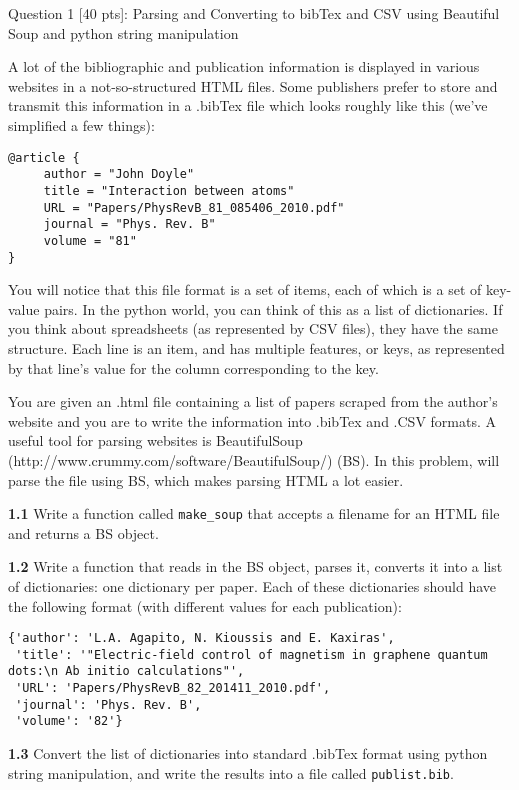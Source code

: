 \documentclass[11pt]{article}
\begin{document}
     Question 1 {[}40 pts{]}: Parsing and Converting to bibTex and CSV using
Beautiful Soup and python string manipulation

A lot of the bibliographic and publication information is displayed in
various websites in a not-so-structured HTML files. Some publishers
prefer to store and transmit this information in a .bibTex file which
looks roughly like this (we've simplified a few things):

\begin{verbatim}
@article { 
     author = "John Doyle"
     title = "Interaction between atoms"
     URL = "Papers/PhysRevB_81_085406_2010.pdf"
     journal = "Phys. Rev. B"
     volume = "81"
}
\end{verbatim}

You will notice that this file format is a set of items, each of which
is a set of key-value pairs. In the python world, you can think of this
as a list of dictionaries. If you think about spreadsheets (as
represented by CSV files), they have the same structure. Each line is an
item, and has multiple features, or keys, as represented by that line's
value for the column corresponding to the key.

You are given an .html file containing a list of papers scraped from the
author's website and you are to write the information into .bibTex and
.CSV formats. A useful tool for parsing websites is BeautifulSoup
(http://www.crummy.com/software/BeautifulSoup/) (BS). In this problem,
will parse the file using BS, which makes parsing HTML a lot easier.

\textbf{1.1} Write a function called \texttt{make\_soup} that accepts a
filename for an HTML file and returns a BS object.

\textbf{1.2} Write a function that reads in the BS object, parses it,
converts it into a list of dictionaries: one dictionary per paper. Each
of these dictionaries should have the following format (with different
values for each publication):

\begin{verbatim}
{'author': 'L.A. Agapito, N. Kioussis and E. Kaxiras',
 'title': '"Electric-field control of magnetism in graphene quantum dots:\n Ab initio calculations"',
 'URL': 'Papers/PhysRevB_82_201411_2010.pdf',
 'journal': 'Phys. Rev. B',
 'volume': '82'}
\end{verbatim}

\textbf{1.3} Convert the list of dictionaries into standard .bibTex
format using python string manipulation, and write the results into a
file called \texttt{publist.bib}.
\end{document}
